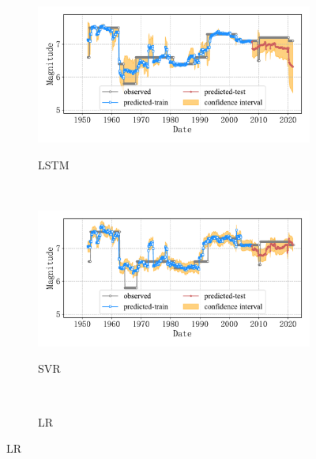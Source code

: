 \begin{figure}[!htbp]
  \vspace{-2cm}
  \centering
  \begin{subfigure}[b]{0.45\textwidth}
    \caption{LSTM}
    \includegraphics[width=\textwidth]{Img/chap5_seism/future10/seism_lstm_minyear_1932_maxyear_2021_spanlat_2_spanlon_4_timewindow_120_nextmonth_120_minmag_3.0_blocks1.pdf}
    \vspace{-1cm}
    \label{fig:seism_lstm_minyear_1932_maxyear_2021_spanlat_2_spanlon_4_timewindow_120_nextmonth_120_minmag_3.0_blocks1}
  \end{subfigure}
  ~
  \begin{subfigure}[b]{0.45\textwidth}
    \caption{SVR} 
    \includegraphics[width=\textwidth]{Img/chap5_seism/future10/seism_svr_minyear_1932_maxyear_2021_spanlat_2_spanlon_4_timewindow_120_nextmonth_120_minmag_3.0_blocks1.pdf}
    \vspace{-1cm}
    \label{fig:seism_svr_minyear_1932_maxyear_2021_spanlat_2_spanlon_4_timewindow_120_nextmonth_120_minmag_3.0_blocks1}
  \end{subfigure}   
  \\
  \begin{subfigure}[b]{0.45\textwidth}
      \caption{LR}
      \vspace{-0.2cm}

\end{subfigure}
\end{figure}
